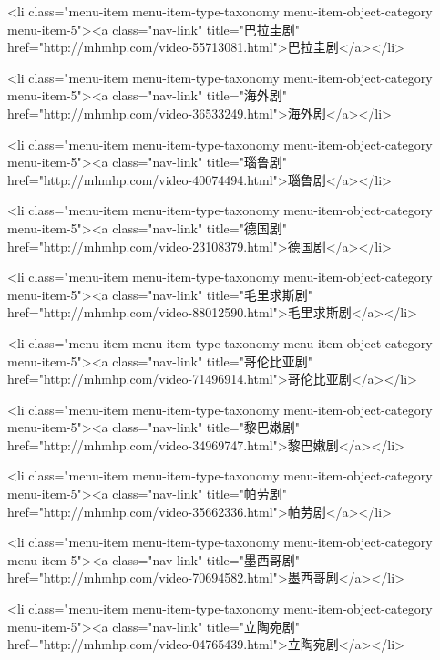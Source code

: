                             <li class="menu-item menu-item-type-taxonomy menu-item-object-category menu-item-5"><a class="nav-link" title="巴拉圭剧" href="http://mhmhp.com/video-55713081.html">巴拉圭剧</a></li>
                            
                            <li class="menu-item menu-item-type-taxonomy menu-item-object-category menu-item-5"><a class="nav-link" title="海外剧" href="http://mhmhp.com/video-36533249.html">海外剧</a></li>
                            
                            <li class="menu-item menu-item-type-taxonomy menu-item-object-category menu-item-5"><a class="nav-link" title="瑙鲁剧" href="http://mhmhp.com/video-40074494.html">瑙鲁剧</a></li>
                            
                            <li class="menu-item menu-item-type-taxonomy menu-item-object-category menu-item-5"><a class="nav-link" title="德国剧" href="http://mhmhp.com/video-23108379.html">德国剧</a></li>
                            
                            <li class="menu-item menu-item-type-taxonomy menu-item-object-category menu-item-5"><a class="nav-link" title="毛里求斯剧" href="http://mhmhp.com/video-88012590.html">毛里求斯剧</a></li>
                            
                            <li class="menu-item menu-item-type-taxonomy menu-item-object-category menu-item-5"><a class="nav-link" title="哥伦比亚剧" href="http://mhmhp.com/video-71496914.html">哥伦比亚剧</a></li>
                            
                            <li class="menu-item menu-item-type-taxonomy menu-item-object-category menu-item-5"><a class="nav-link" title="黎巴嫩剧" href="http://mhmhp.com/video-34969747.html">黎巴嫩剧</a></li>
                            
                            <li class="menu-item menu-item-type-taxonomy menu-item-object-category menu-item-5"><a class="nav-link" title="帕劳剧" href="http://mhmhp.com/video-35662336.html">帕劳剧</a></li>
                            
                            <li class="menu-item menu-item-type-taxonomy menu-item-object-category menu-item-5"><a class="nav-link" title="墨西哥剧" href="http://mhmhp.com/video-70694582.html">墨西哥剧</a></li>
                            
                            <li class="menu-item menu-item-type-taxonomy menu-item-object-category menu-item-5"><a class="nav-link" title="立陶宛剧" href="http://mhmhp.com/video-04765439.html">立陶宛剧</a></li>
                            
